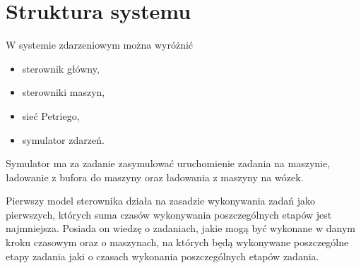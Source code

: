 \documentclass[10pt, a4paper]{article}
\begin{document}
\section{Struktura systemu}

W systemie zdarzeniowym można wyróżnić
\begin{itemize}
\item sterownik główny,
\item sterowniki maszyn,
\item sieć Petriego,
\item symulator zdarzeń.
\end{itemize}

Symulator ma za zadanie zasymulować uruchomienie zadania na maszynie, ładowanie z bufora do maszyny oraz ładowania z maszyny na wózek.

Pierwszy model sterownika działa na zasadzie wykonywania zadań jako pierwszych, których suma czasów wykonywania poszczególnych etapów jest najmniejsza. Posiada on wiedzę o zadaniach, jakie mogą być wykonane w danym kroku czasowym oraz o maszynach, na których będą wykonywane poszczególne etapy zadania jaki o czasach wykonania poszczególnych etapów zadania.
\end{document}
